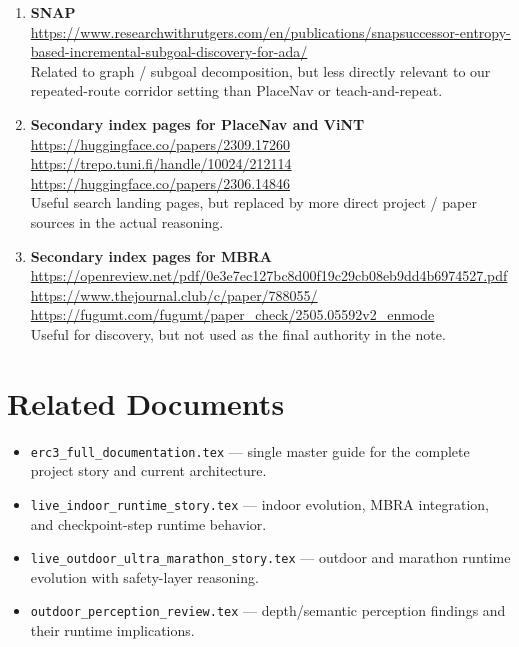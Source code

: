 \documentclass[11pt,a4paper]{article}
\begin{document}
\begin{enumerate}[nosep]
  \item \textbf{SNAP} \\
  \url{https://www.researchwithrutgers.com/en/publications/snapsuccessor-entropy-based-incremental-subgoal-discovery-for-ada/} \\
  Related to graph / subgoal decomposition, but less directly relevant to our
  repeated-route corridor setting than PlaceNav or teach-and-repeat.

  \item \textbf{Secondary index pages for PlaceNav and ViNT} \\
  \url{https://huggingface.co/papers/2309.17260} \\
  \url{https://trepo.tuni.fi/handle/10024/212114} \\
  \url{https://huggingface.co/papers/2306.14846} \\
  Useful search landing pages, but replaced by more direct project / paper
  sources in the actual reasoning.

  \item \textbf{Secondary index pages for MBRA} \\
  \url{https://openreview.net/pdf/0e3e7ec127bc8d00f19c29cb08eb9dd4b6974527.pdf} \\
  \url{https://www.thejournal.club/c/paper/788055/} \\
  \url{https://fugumt.com/fugumt/paper_check/2505.05592v2_enmode} \\
  Useful for discovery, but not used as the final authority in the note.
\end{enumerate}


\section{Related Documents}
\begin{itemize}
  \item \texttt{erc3\_full\_documentation.tex} --- single master guide for the complete project story and current architecture.
  \item \texttt{live\_indoor\_runtime\_story.tex} --- indoor evolution, MBRA integration, and checkpoint-step runtime behavior.
  \item \texttt{live\_outdoor\_ultra\_marathon\_story.tex} --- outdoor and marathon runtime evolution with safety-layer reasoning.
  \item \texttt{outdoor\_perception\_review.tex} --- depth/semantic perception findings and their runtime implications.
\end{itemize}
\end{document}
